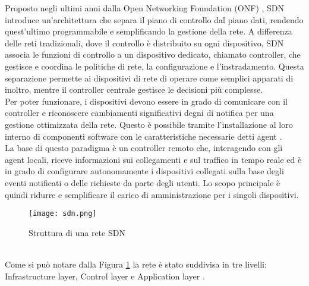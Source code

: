 Proposto negli ultimi anni dalla Open Networking Foundation (ONF) \cite{ONF}, SDN introduce un'architettura che separa il piano di controllo dal piano dati, rendendo quest'ultimo programmabile e semplificando la gestione della rete. 
A differenza delle reti tradizionali, dove il controllo è distribuito su ogni dispositivo, SDN associa le funzioni di controllo a un dispositivo dedicato, chiamato controller, che gestisce e coordina le politiche di rete, la configurazione e l'instradamento.
Questa separazione permette ai dispositivi di rete di operare come semplici apparati di inoltro, mentre il controller centrale gestisce le decisioni più complesse. %
\\Per poter funzionare, i dispositivi devono essere in grado di comunicare con il controller e riconoscere cambiamenti significativi degni di notifica per una gestione ottimizzata della rete. %
Questo è possibile tramite l'installazione al loro interno di componenti software con le caratteristiche necessarie
detti agent \cite{tesiSDN:2017}.
\\La base di questo paradigma è un controller remoto che, interagendo con gli agent
locali, riceve informazioni sui collegamenti e sul traffico in tempo reale ed è in grado di
configurare autonomamente i dispositivi collegati sulla base degli eventi notificati o delle richieste da parte degli utenti. Lo scopo
principale è quindi ridurre e semplificare il carico di amministrazione per i singoli dispositivi.
\begin{figure}[h]
    \centering
   \texttt{[image: sdn.png]}
    \caption{Struttura di una rete SDN \cite{fotosdn}}
    \label{fig:sdnF}
\end{figure}
\\Come si può notare dalla Figura \ref{fig:sdnF} la rete è stato suddivisa in tre livelli: Infrastructure layer, Control layer e Application layer \cite{sdnlayers}.

